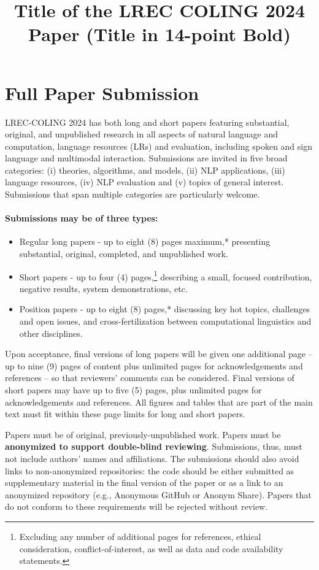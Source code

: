 \documentclass[10pt, a4paper]{article}
\title{Title of the LREC COLING 2024 Paper (Title in 14-point Bold)\\ \vspace*{.5\baselineskip} \normalfont{ The Title \ul{Must Be} Capitalised as in:\\ \vspace*{.5\baselineskip} \textbf{The Rise and Fall of Ziggy Stardust and the Spiders from Mars}}}
\begin{document}
\maketitleabstract

\section{Full Paper Submission}

LREC-COLING 2024 has both long and short papers featuring substantial, original, and unpublished research in all aspects of natural language and computation, language resources (LRs) and evaluation, including spoken and sign language and multimodal interaction. Submissions are invited in five broad categories: (i) theories, algorithms, and models, (ii) NLP applications, (iii) language resources, (iv) NLP evaluation and (v) topics of general interest. Submissions that span multiple categories are particularly welcome.   

\paragraph{Submissions may be of three types:}

\begin{itemize}
\item Regular long papers - up to eight (8) pages maximum,* presenting substantial, original, completed, and unpublished work.
\item Short papers - up to four (4) pages,\footnote{Excluding any number of additional pages for references, ethical consideration, conflict-of-interest, as well as data and code availability statements.} describing a small, focused contribution, negative results, system demonstrations, etc.
\item  Position papers - up to eight (8) pages,* discussing key hot topics, challenges and open issues, and cross-fertilization between computational linguistics and other disciplines.
\end{itemize}

Upon acceptance, final versions of long papers will be given one
additional page – up to nine (9) pages of content plus unlimited pages for acknowledgements and references – so that reviewers’ comments can be considered. Final versions of short papers may have up to five (5) pages, plus unlimited pages for acknowledgements and references. All figures and tables that are part of the main text must fit within these page limits for long and short papers.

Papers must be of original, previously-unpublished work. Papers must be \textbf{anonymized to support double-blind reviewing}. Submissions, thus, must not include authors’ names and affiliations. The submissions should also avoid links to non-anonymized repositories: the code should be either submitted as supplementary material in the final version of the paper or as a link to an anonymized repository (e.g., Anonymous GitHub or Anonym Share). Papers that do not conform to these requirements will be rejected without review.
\end{document}
